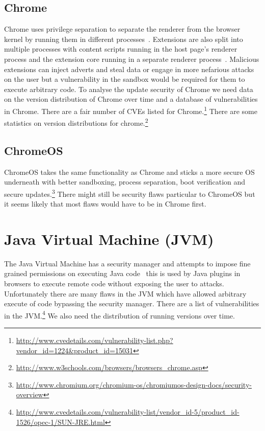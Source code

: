 \documentclass[12pt,a4paper]{article}
\begin{document}
\subsection{Chrome}
Chrome uses privilege separation to separate the renderer from the browser kernel by running them in different processes~\cite{Barth2008}.
Extensions are also split into multiple processes with content scripts running in the host page's renderer process and the extension core running in a separate renderer process~\cite{Liu2012}.
Malicious extensions can inject adverts and steal data or engage in more nefarious attacks on the user but a vulnerability in the sandbox would be required for them to execute arbitrary code.
To analyse the update security of Chrome we need data on the version distribution of Chrome over time and a database of vulnerabilities in Chrome.
There are a fair number of CVEs listed for Chrome.\footnote{\url{http://www.cvedetails.com/vulnerability-list.php?vendor_id=1224&product_id=15031}}
There are some statistics on version distributions for chrome.\footnote{\url{http://www.w3schools.com/browsers/browsers_chrome.asp}}

\subsection{ChromeOS}
ChromeOS takes the same functionality as Chrome and sticks a more secure OS underneath with better sandboxing, process separation, boot verification and secure updates.\footnote{\url{http://www.chromium.org/chromium-os/chromiumos-design-docs/security-overview}}
There might still be security flaws particular to ChromeOS but it seems likely that most flaws would have to be in Chrome first.

\section{Java Virtual Machine (JVM)}
The Java Virtual Machine has a security manager and attempts to impose fine grained permissions on executing Java code~\cite{Gong1997} this is used by Java plugins in browsers to execute remote code without exposing the user to attacks.
Unfortunately there are many flaws in the JVM which have allowed arbitrary execute of code bypassing the security manager.
There are a list of vulnerabilities in the JVM.\footnote{\url{http://www.cvedetails.com/vulnerability-list/vendor_id-5/product_id-1526/opec-1/SUN-JRE.html}}
We also need the distribution of running versions over time.
\end{document}
